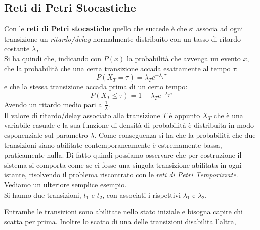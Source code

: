 \documentclass[a4paper,12pt, oneside]{book}
\begin{document}
\subsection{Reti di Petri Stocastiche}
Con le \textbf{reti di Petri stocastiche} quello che succede è che si associa ad
ogni transizione un \textit{ritardo/delay} normalmente distribuito con un tasso
di ritardo costante $\lambda_T$.\\
Si ha quindi che, indicando con $P(x)$ la probabilità che avvenga un evento $x$,
che la probabilità che una certa transizione accada esattamente al tempo $\tau$:
\[P(X_T=\tau)=\lambda_Te^{-\lambda_T\tau}\]
e che la stessa transizione accada prima di un certo tempo:
\[P(X_T\leq\tau)=1-\lambda_Te^{-\lambda_T\tau}\]
Avendo un ritardo medio pari a $\frac{1}{\lambda}$.\\
Il valore di ritardo/delay associato alla transizione $T$ è appunto $X_T$ che è
una variabile casuale e la sua funzione di densità di probabilità è distribuita
in modo esponenziale sul parametro $\lambda$. Come conseguenza si ha che la
probabilità che due transizioni siano abilitate contemporaneamente è
estremamente bassa, praticamente nulla. Di fatto quindi possiamo osservare che
per costruzione il sistema si comporta come se ci fosse una singola transizione
abilitata in ogni istante, risolvendo il problema riscontrato con le
\textit{reti di Petri Temporizzate}.\\
Vediamo un ulteriore semplice esempio.\\
Si hanno due transizioni, $t_1$ e $t_2$, con associati i rispettivi $\lambda_1$
e $\lambda_2$. 
\begin{figure}[H]
  \centering
\end{figure}
Entrambe le transizioni sono abilitate nello stato iniziale e bisogna capire chi
scatta per prima. Inoltre lo scatto di una delle transizioni disabilita l'altra,
\end{document}
